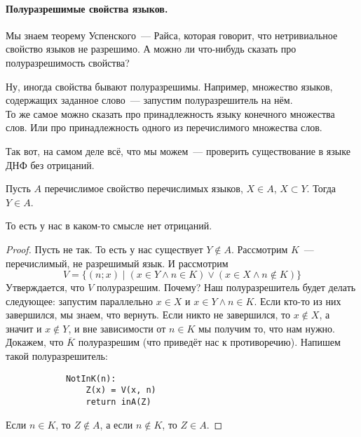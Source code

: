 \documentclass{article}
\begin{document}
    \paragraph{Полуразрешимые свойства языков.}
    \begin{remark}
        Мы знаем теорему Успенского~--- Райса, которая говорит, что нетривиальное свойство языков не разрешимо. А можно ли что-нибудь сказать про полуразрешимость свойства?
    \end{remark}
    \begin{example}
        Ну, иногда свойства бывают полуразрешимы. Например, множество языков, содержащих заданное слово~--- запустим полуразрешитель на нём.\\
        То же самое можно сказать про принадлежность языку конечного множества слов. Или про принадлежность одного из перечислимого множества слов.
    \end{example}
    \begin{remark}
        Так вот, на самом деле всё, что мы можем~--- проверить существование в языке ДНФ без отрицаний.
    \end{remark}
    \begin{lemma}
        Пусть $A$ перечислимое свойство перечислимых языков, $X\in A$, $X\subset Y$. Тогда $Y\in A$.
    \end{lemma}
    \begin{remark}
        То есть у нас в каком-то смысле нет отрицаний.
    \end{remark}
    \begin{proof}
        Пусть не так. То есть у нас существует $Y\notin A$. Рассмотрим $K$~--- перечислимый, не разрешимый язык. И рассмотрим
        $$
        V = \{(n;x)\mid (x\in Y\land n\in K)\lor (x\in X\land n\notin K)\}
        $$
        Утверждается, что $V$ полуразрешим. Почему? Наш полуразрешитель будет делать следующее: запустим параллельно $x\in X$ и $x\in Y\land n\in K$. Если кто-то из них завершился, мы знаем, что вернуть. Если никто не завершился, то $x\notin X$, а значит и $x\notin Y$, и вне зависимости от $n\in K$ мы получим то, что нам нужно.\\
        Докажем, что $\overline K$ полуразрешим (что приведёт нас к противоречию). Напишем такой полуразрешитель:
        \begin{verbatim}
            NotInK(n):
                Z(x) = V(x, n)
                return inA(Z)
        \end{verbatim}
        Если $n\in K$, то $Z\notin A$, а если $n\notin K$, то $Z\in A$.
    \end{proof}
\end{document}
